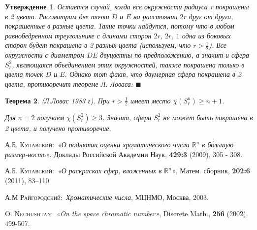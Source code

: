 \documentclass{report}%
\newtheorem{theorem}{Теорема}
\newtheorem{claim}[theorem]{Утверждение}
\newenvironment{proof}{\par\noindent{\bf Доказательство.}}{\hfill$\scriptstyle\blacksquare$}
\begin{document}
\begin{claim}
\begin{proof}
				Остается случай, когда все окружности радиуса r покрашены в 2 цвета.
				Рассмотрим две точки $D$ и $E$ на расстоянии $2r$ друг от друга, покрашенные в разные цвета.
				Такие точки найдутся, потому что в любом равнобедренном треугольнике с длинами сторон $2r$, $2r$, $1$
				одна из боковых сторон будет покрашена в 2 разных цвета (используем, что $r > \frac{1}{2}$).
				Все окружности с диаметром $DE$ двуцветны по предположению, а значит и сфера $S_r^2$,
				являющаяся объединением этих окружностей, также покрашена только в цвета точек $D$ и $E$.
				Однако тот факт, что двумерная сфера покрашена в 2 цвета, противоречит теореме Л. Ловаса:
		\end{proof}
\end{claim}

\begin{theorem}(Л.Ловас 1983 г).
		При $r > \frac{1}{2}$ имеет место $\chi(S_r^n) \geq n + 1$.
		
		Для $n = 2$ получаем  $\chi(S_r^2) \geq 3$.
		Значит, сфера $S_r^2$ не может быть покрашена в 2 цвета, и получено противоречие.
\end{theorem}

\begin{thebibliography}{4}

 \textsc{А.Б. Купавский}:\ \textit{«О поднятии оценки хроматического числа
 $\mathbb{R}^n$ в б\'{о}льшую размер-ность»},  Доклады Российской Академии Наук, \textbf{429:3} (2009), 305 - 308.

 \textsc{А.Б. Купавский}:\ \textit{«О раскрасках сфер, вложенных в $\mathbb{R}^n$»},
Матем. сборник, \textbf{202:6} (2011), 83–110.

 \textsc{А.М Райгородский}:\ \textit{Хроматические числа}, МЦНМО, Москва, 2003.

 \textsc{O. Nechushtan}:\ \textit{«On the space chromatic number»},
 Discrete Math., \textbf{256} (2002), 499-507.

\end{thebibliography}
\end{document}
